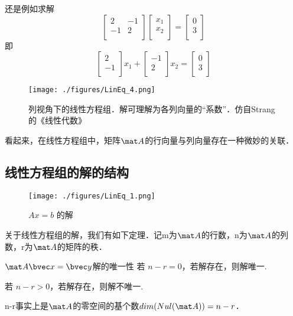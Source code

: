 \begin{example}{}
还是例如求解
$$
\begin{bmatrix}
2&-1\\
-1&2\\
\end{bmatrix}
\begin{bmatrix}
x_1\\
x_2\\
\end{bmatrix}
=
\begin{bmatrix}
0\\
3\\
\end{bmatrix}
$$
即
$$
\begin{bmatrix}
2\\
-1\\
\end{bmatrix}
x_1
+
\begin{bmatrix}
-1\\
2\\
\end{bmatrix}
x_2
=
\begin{bmatrix}
0\\
3\\
\end{bmatrix}
$$
\begin{figure}[ht]
\centering
\texttt{[image: ./figures/LinEq\_4.png]}
\caption{列视角下的线性方程组．解可理解为各列向量的“系数”．仿自Strang的《线性代数》} \label{LinEq_fig4}
\end{figure}
\end{example}
看起来，在线性方程组中，矩阵$\mat A$的行向量与列向量存在一种微妙的关联．

\subsection{线性方程组的解的结构}
\begin{figure}[ht]
\centering
\texttt{[image: ./figures/LinEq\_1.png]}
\caption{$Ax=b$ 的解} \label{LinEq_fig1}
\end{figure}

关于线性方程组的解，我们有如下定理．记m为$\mat A$的行数，n为$\mat A$的列数，r为$\mat A$的矩阵的秩．
\begin{theorem}{$\mat A \bvec x=\bvec y$解的唯一性}
若 $n-r=0$，若解存在，则解唯一.

若 $n-r>0$，若解存在，则解不唯一.
\end{theorem}
n-r事实上是$\mat A$的零空间的基个数$dim(Nul(\mat A))=n-r$．

